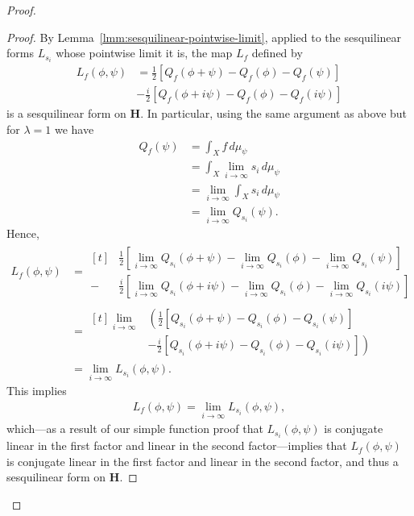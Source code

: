 \begin{proof}
\begin{proof}
By Lemma~\ref{lmm:sesquilinear-pointwise-limit}, applied to the sesquilinear forms $L_{s_i}$ whose pointwise limit it is, the map $L_f$ defined by
\begin{align}
    L_f(\phi, \psi) &= \frac{1}{2} \left[ Q_f(\phi + \psi) - Q_f(\phi) - Q_f(\psi) \right] \\
                    &-\frac{i}{2} \left[ Q_f(\phi + i\psi) - Q_f(\phi) - Q_f(i\psi) \right]
\end{align}
is a sesquilinear form on $\mathbf{H}$. In particular, using the same argument as above but for $\lambda = 1$ we have
\begin{align}
    Q_f(\psi) &= \int_X f \, d\mu_{\psi} \\
              &= \int_X \lim\limits_{i \rightarrow \infty} s_i \, d\mu_{\psi} \\
              &= \lim\limits_{i \rightarrow \infty} \int_X s_i \, d\mu_{\psi} \\
              &= \lim\limits_{i \rightarrow \infty} Q_{s_i}(\psi).
\end{align}
Hence,
\begin{align}
    L_f(\phi, \psi) &=
    \begin{aligned}[t]
        &\frac{1}{2} \left[ \lim\limits_{i \rightarrow \infty} Q_{s_i}(\phi + \psi) - \lim\limits_{i \rightarrow \infty} Q_{s_i}(\phi) - \lim\limits_{i \rightarrow \infty} Q_{s_i}(\psi) \right] \\
       -&\frac{i}{2} \left[ \lim\limits_{i \rightarrow \infty} Q_{s_i}(\phi + i\psi) - \lim\limits_{i \rightarrow \infty} Q_{s_i}(\phi) - \lim\limits_{i \rightarrow \infty} Q_{s_i}(i\psi) \right]
    \end{aligned} \\
    &=
    \begin{aligned}[t]
        \lim\limits_{i \rightarrow \infty} &\left( \frac{1}{2} \left[ Q_{s_i}(\phi + \psi) - Q_{s_i}(\phi) - Q_{s_i}(\psi) \right] \right. \\
        &-\left. \frac{i}{2} \left[ Q_{s_i}(\phi + i\psi) - Q_{s_i}(\phi) - Q_{s_i}(i\psi) \right] \right)
    \end{aligned} \\
    &= \lim\limits_{i \rightarrow \infty} L_{s_i}(\phi, \psi).
\end{align}
This implies
\begin{align}
    L_f(\phi, \psi) = \lim\limits_{i \rightarrow \infty} L_{s_i}(\phi, \psi),
\end{align}
which---as a result of our simple function proof that $L_{s_i}(\phi, \psi)$ is conjugate linear in the first factor and linear in the second factor---implies that $L_f(\phi, \psi)$ is conjugate linear in the first factor and linear in the second factor, and thus a sesquilinear form on $\mathbf{H}$.


\end{proof}
\end{proof}
